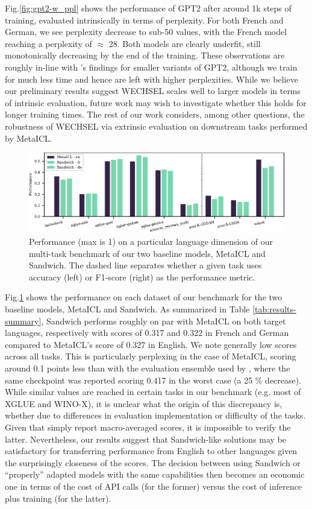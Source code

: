\documentclass[11pt]{article}
\begin{document}
Fig.\@ \ref{fig:gpt2-w_ppl} shows the performance of GPT2 after around 1k steps of training,
evaluated intrinsically in terms of perplexity. For both French and German, we see perplexity
decrease to sub-50 values, with the French model reaching a perplexity of $\approx$ 28. Both models
are clearly underfit, still monotonically decreasing by the end of the training. These observations
are roughly in-line with \citet{minixhofer_wechsel_2022}'s findings for smaller variants of GPT2,
although we train for much less time and hence are left with higher perplexities. While we believe
our preliminary results suggest WECHSEL scales well to larger models in terms of intrinsic
evaluation, future work may wish to investigate whether this holds for longer training times. The
rest of our work considers, among other questions, the robustness of WECHSEL via extrinsic
evaluation on downstream tasks performed by MetaICL.

\begin{figure}[ht]
	\includegraphics{baselines.pdf}
	\caption{Performance (max is 1) on a particular language dimension of our multi-task benchmark of
		our two baseline models, MetaICL and Sandwich. The dashed line separates whether a given task uses
		accuracy (left) or F1-score (right) as the performance metric.}
	\label{fig:baselines}
\end{figure}

Fig.\@ \ref{fig:baselines} shows the performance on each dataset of our benchmark for the two
baseline models, MetaICL and Sandwich. As summarized in Table \ref{tab:results-summary}, Sandwich
performs roughly on par with MetaICL on both target languages, respectively with scores of 0.317 and
0.322 in French and German compared to MetaICL's score of 0.327 in English. We note generally low
scores across all tasks. This is particularly perplexing in the case of MetaICL, scoring around
0.1 points less than with the evaluation ensemble used by \citet{min_metaicl_2022}, where the same
checkpoint was reported scoring 0.417 in the worst case (a 25 \% decrease). While similar values
are reached in certain tasks in our benchmark (e.g. most of XGLUE and WINO-X), it is unclear what
the origin of this discrepancy is, whether due to differences in evaluation implementation or
difficulty of the tasks. Given that \citet{min_metaicl_2022} simply report macro-averaged scores,
it is impossible to verify the latter. Nevertheless, our results suggest that Sandwich-like
solutions may be satisfactory for transferring performance from English to other languages given
the surprisingly closeness of the scores. The decision between using Sandwich or ``properly''
adapted models with the same capabilities then becomes an economic one in terms of the cost of API
calls (for the former) versus the cost of inference plus training (for the latter).
\end{document}
